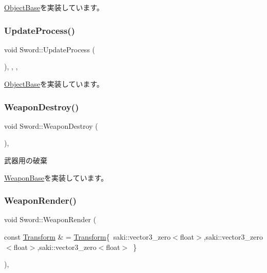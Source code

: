 \mbox{\hyperlink{class_object_base_aeac51d868beeb7f7fe900407b76b93a2}{Object\+Base}}を実装しています。

\mbox{\label{class_sword_a3e0221aa5c05ecada9def39fb38c0059}} 
\subsubsection{\texorpdfstring{Update\+Process()}{UpdateProcess()}}
{\footnotesize\ttfamily void Sword\+::\+Update\+Process (\begin{DoxyParamCaption}{ }\end{DoxyParamCaption})\hspace{0.3cm}{\ttfamily [inline]}, {\ttfamily [final]}, {\ttfamily [protected]}, {\ttfamily [virtual]}}



\mbox{\hyperlink{class_object_base_a8b5b72b363a419767efde0b0e692ea95}{Object\+Base}}を実装しています。

\mbox{\label{class_sword_a3f60d8b24b7847d6a84f0941820b711d}} 
\subsubsection{\texorpdfstring{Weapon\+Destroy()}{WeaponDestroy()}}
{\footnotesize\ttfamily void Sword\+::\+Weapon\+Destroy (\begin{DoxyParamCaption}{ }\end{DoxyParamCaption})\hspace{0.3cm}{\ttfamily [final]}, {\ttfamily [virtual]}}



武器用の破棄 



\mbox{\hyperlink{class_weapon_base_a417784a8c8bf73cd398a77b922fc110c}{Weapon\+Base}}を実装しています。

\mbox{\label{class_sword_ac80e3b54ef5572eae1e4760d14383f4f}} 
\subsubsection{\texorpdfstring{Weapon\+Render()}{WeaponRender()}}
{\footnotesize\ttfamily void Sword\+::\+Weapon\+Render (\begin{DoxyParamCaption}\item[{const \mbox{\hyperlink{common_8h_a1c43cb8f0d8a41901f3ce4c67dbbce20}{Transform}} \&}]{ = {\ttfamily \mbox{\hyperlink{common_8h_a1c43cb8f0d8a41901f3ce4c67dbbce20}{Transform}}\{~saki\+:\+:vector3\+\_\+zero$<$float$>$,saki\+:\+:vector3\+\_\+zero$<$float$>$,saki\+:\+:vector3\+\_\+zero$<$float$>$~\}} }\end{DoxyParamCaption})\hspace{0.3cm}{\ttfamily [final]}, {\ttfamily [virtual]}}



